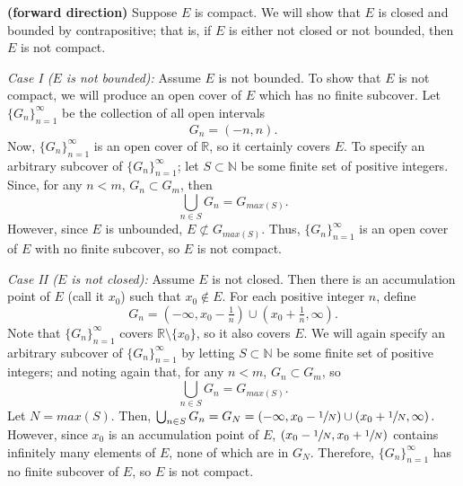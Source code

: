 \documentclass[11pt]{article}
\makeatletter
\renewenvironment{proof}{{\bfseries Proof}}{\qed}
\renewenvironment{proof}[1][\bfseries \proofname]{\par
  \pushQED{\qed}%
  \normalfont \topsep6\p@\@plus6\p@\relax
  \trivlist
  \item[\hskip\labelsep
        \scshape
    #1\@addpunct{}]\ignorespaces
}{%
  \popQED\endtrivlist\@endpefalse
}
\newcommand{\N}{\mathbb{N}}
\newcommand{\R}{\mathbb{R}}
\makeatother
\begin{document}
\begin{proof} \textbf{(forward direction)}
Suppose $E$ is compact. We will show that $E$ is closed and bounded by contrapositive; that is, if $E$ is either not closed or not bounded, then $E$ is not compact.

\textit{Case I ($E$ is not bounded):} Assume $E$ is not bounded. To show that $E$ is not compact, we will produce an open cover of $E$ which has no finite subcover. Let $\{G_n\}_{n=1}^{\infty}$ be the collection of all open intervals 
$$G_n = (-n,n).$$ 
Now, $\{G_n\}_{n=1}^{\infty}$ is an open cover of $\R$, so it certainly covers $E$. To specify an arbitrary subcover of $\{G_n\}_{n=1}^{\infty}$; let $S \subset \N$ be some finite set of positive integers. Since, for any $n<m$, $G_n \subset G_m$, then 
$$\bigcup_{n \in S} G_n = G_{max(S)}.$$  
However, since $E$ is unbounded, $E \not\subset G_{max(S)}$. Thus, $\{G_n\}_{n=1}^{\infty}$ is an open cover of $E$ with no finite subcover, so $E$ is not compact. 

\textit{Case II ($E$ is not closed):} Assume $E$ is not closed. Then there is an accumulation point of $E$ (call it $x_0$) such that $x_0 \not\in E$. For each positive integer $n$, define
$$G_n = \left(-\infty, x_0-\tfrac{1}{n}\right) \cup \left(x_0+\tfrac{1}{n}, \infty\right).$$
Note that $\{G_n\}_{n=1}^{\infty}$ covers $\R \setminus \{x_0\}$, so it also covers $E$. We will again specify an arbitrary subcover of $\{G_n\}_{n=1}^{\infty}$ by letting $S \subset \N$ be some finite set of positive integers; and noting again that, for any $n<m$, $G_n \subset G_m$, so 
$$\bigcup_{n \in S} G_n = G_{max(S)}.$$
Let $N = max(S)$. Then, $\bigcup_{n \in S} G_n  = G_N = \left(-\infty, x_0-\sfrac{1}{N}\right) \cup \left(x_0+\sfrac{1}{N}, \infty\right).$ However, since $x_0$ is an accumulation point of $E$, $(x_0-\sfrac{1}{N} , x_0+\sfrac{1}{N})$ contains infinitely many elements of $E$, none of which are in $G_N$. Therefore, $\{G_n\}_{n=1}^{\infty}$ has no finite subcover of $E$, so $E$ is not compact. 
\end{proof}

\newpage
\begin{center}
\end{center}
\end{document}
